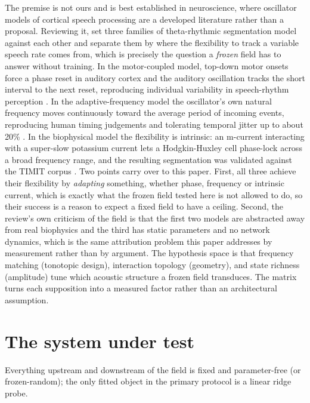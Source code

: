 \documentclass{article}
\makeatletter
\newcommand{\iclr@floatbarrier}{\par\vspace{\z@}%
  \ifx\@deferlist\@empty\else\clearpage\fi}
\let\iclr@section\section
\renewcommand{\section}{\iclr@floatbarrier\iclr@section}
\makeatother
\begin{document}
The premise is not ours and is best established in neuroscience, where
oscillator models of cortical speech processing are a developed
literature rather than a proposal. Reviewing it, \citep{dogonasheva2026}
set three families of theta-rhythmic segmentation model against each
other and separate them by where the flexibility to track a variable
speech rate comes from, which is precisely the question a \emph{frozen}
field has to answer without training. In the motor-coupled model,
top-down motor onsets force a phase reset in auditory cortex and the
auditory oscillation tracks the short interval to the next reset,
reproducing individual variability in speech-rhythm perception
\citep{assaneo2020}. In the adaptive-frequency model the oscillator's
own natural frequency moves continuously toward the average period of
incoming events, reproducing human timing judgements and tolerating
temporal jitter up to about 20\% \citep{doelling2023}. In the
biophysical model the flexibility is intrinsic: an m-current interacting
with a super-slow potassium current lets a Hodgkin-Huxley cell
phase-lock across a broad frequency range, and the resulting
segmentation was validated against the TIMIT corpus
\citep{pittman-polletta2021}. Two points carry over to this paper.
First, all three achieve their flexibility by \emph{adapting} something,
whether phase, frequency or intrinsic current, which is exactly what the
frozen field tested here is not allowed to do, so their success is a
reason to expect a fixed field to have a ceiling. Second, the review's
own criticism of the field is that the first two models are abstracted
away from real biophysics and the third has static parameters and no
network dynamics, which is the same attribution problem this paper
addresses by measurement rather than by argument. The hypothesis space
is that frequency matching (tonotopic design), interaction topology
(geometry), and state richness (amplitude) tune which acoustic structure
a frozen field transduces. The matrix turns each supposition into a
measured factor rather than an architectural assumption.

\section{The system under test}\label{the-system-under-test}

Everything upstream and downstream of the field is fixed and
parameter-free (or frozen-random); the only fitted object in the primary
protocol is a linear ridge probe.
\end{document}
